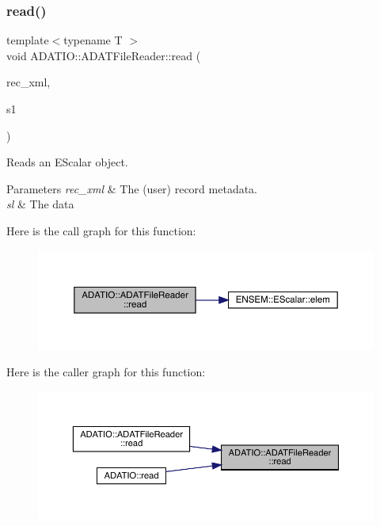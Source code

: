 \subsubsection{\texorpdfstring{read()}{read()}\hspace{0.1cm}{\footnotesize\ttfamily [1/7]}}
{\footnotesize\ttfamily template$<$typename T $>$ \\
void A\+D\+A\+T\+I\+O\+::\+A\+D\+A\+T\+File\+Reader\+::read (\begin{DoxyParamCaption}\item[{\mbox{\hyperlink{classADATXML_1_1XMLReader}{X\+M\+L\+Reader}} \&}]{rec\+\_\+xml,  }\item[{\mbox{\hyperlink{classENSEM_1_1EScalar}{E\+Scalar}}$<$ T $>$ \&}]{s1 }\end{DoxyParamCaption})}



Reads an E\+Scalar object. 


\begin{DoxyParams}{Parameters}
{\em rec\+\_\+xml} & The (user) record metadata. \\
\hline
{\em sl} & The data \\
\hline
\end{DoxyParams}
Here is the call graph for this function\+:
\nopagebreak
\begin{figure}[H]
\begin{center}
\leavevmode
\includegraphics[width=350pt]{db/de5/group__qio_gac92ce1b0fee7c00b8a7dc988f3d4906e_cgraph}
\end{center}
\end{figure}
Here is the caller graph for this function\+:
\nopagebreak
\begin{figure}[H]
\begin{center}
\leavevmode
\includegraphics[width=350pt]{db/de5/group__qio_gac92ce1b0fee7c00b8a7dc988f3d4906e_icgraph}
\end{center}
\end{figure}
\mbox{\label{group__qio_ga32969d6bfdfe9da2912e92d1f0871c20}} 
